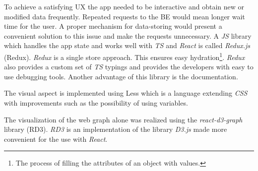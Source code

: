 To achieve a satisfying UX the app needed to be interactive and obtain new or modified data frequently. Repeated requests to the BE would mean longer wait time for the user. A proper mechanism for data-storing would present a convenient solution to this issue and make the requests unnecessary. A \textit{JS} library which handles the app state and works well with \textit{TS} and \textit{React} is called \textit{Redux.js} \cite{redux} (Redux). \textit{Redux} is a single store approach. This ensures easy hydration\footnote{The process of filling the attributes of an object with values.}. \textit{Redux} also provides a custom set of \textit{TS} typings and provides the developers with easy to use debugging tools. Another advantage of this library is the documentation.

The visual aspect is implemented using Less \cite{less} which is a language extending \textit{CSS} with improvements such as the possibility of using variables.

The visualization of the web graph alone was realized using the \textit{react-d3-graph} library \cite{reactD3Graph} (RD3). \textit{RD3} is 
an implementation of the library \textit{D3.js} \cite{d3} made more convenient for the use with \textit{React}. 

